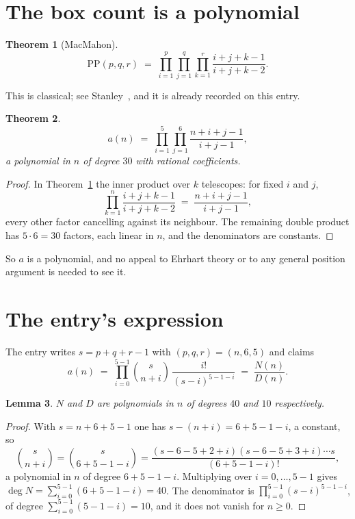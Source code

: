 \documentclass[11pt,a4paper]{article}
\theoremstyle{plain}
\newtheorem{theorem}{Theorem}
\newtheorem{lemma}[theorem]{Lemma}
\theoremstyle{definition}
\begin{document}
\section{The box count is a polynomial}

\begin{theorem}[MacMahon]\label{thm:mm}
\[
\mathrm{PP}(p,q,r)\;=\;\prod_{i=1}^{p}\prod_{j=1}^{q}\prod_{k=1}^{r}
\frac{i+j+k-1}{i+j+k-2} .
\]
\end{theorem}

This is classical; see Stanley~\cite{stanley}, and it is already recorded on this entry.

\begin{theorem}\label{thm:poly}
\[
a(n)\;=\;\prod_{i=1}^{5}\prod_{j=1}^{6}\frac{n+i+j-1}{i+j-1},
\]
a polynomial in $n$ of degree $30$ with rational coefficients.
\end{theorem}

\begin{proof}
In Theorem~\ref{thm:mm} the inner product over $k$ telescopes: for fixed $i$ and $j$,
\[
\prod_{k=1}^{n}\frac{i+j+k-1}{i+j+k-2}\;=\;\frac{n+i+j-1}{i+j-1} ,
\]
every other factor cancelling against its neighbour. The remaining double product has
$5\cdot6=30$ factors, each linear in $n$, and the denominators are constants.
\end{proof}

So $a$ is a polynomial, and no appeal to Ehrhart theory or to any general position argument is
needed to see it.

\section{The entry's expression}

The entry writes $s=p+q+r-1$ with $(p,q,r)=(n,6,5)$ and claims
\[
a(n)\;=\;\prod_{i=0}^{5-1}\binom{s}{n+i}\,\frac{i!}{(s-i)^{5-1-i}}\;=\;
\frac{N(n)}{D(n)} .
\]

\begin{lemma}\label{lem:deg}
$N$ and $D$ are polynomials in $n$ of degrees $40$ and $10$ respectively.
\end{lemma}

\begin{proof}
With $s=n+6+5-1$ one has $s-(n+i)=6+5-1-i$, a constant, so
\[
\binom{s}{n+i}=\binom{s}{6+5-1-i}
=\frac{(s-6-5+2+i)(s-6-5+3+i)\cdots s}{(6+5-1-i)!},
\]
a polynomial in $n$ of degree $6+5-1-i$. Multiplying over $i=0,\dots,5-1$ gives
$\deg N=\sum_{i=0}^{5-1}(6+5-1-i)=40$. The denominator is
$\prod_{i=0}^{5-1}(s-i)^{5-1-i}$, of degree
$\sum_{i=0}^{5-1}(5-1-i)=10$, and it does not vanish for $n\ge0$.
\end{proof}
\end{document}
